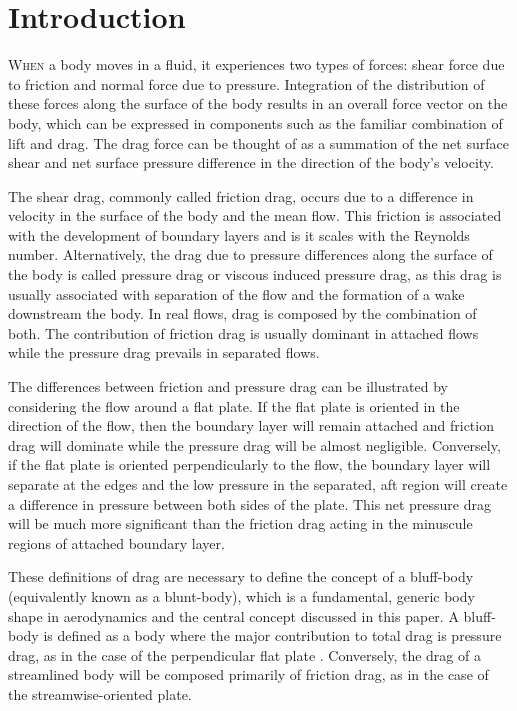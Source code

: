 \documentclass[journal]{new-aiaa}
\begin{document}
\section{Introduction} \label{sec:intro}


\lettrine{W}{hen} a body moves in a fluid, it experiences two types of forces: shear force due to friction and normal force due to pressure. Integration of the distribution of these forces along the surface of the body results in an overall force vector on the body, which can be expressed in components such as the familiar combination of lift and drag. The drag force can be thought of as a summation of the net surface shear and net surface pressure difference in the direction of the body's velocity.

The shear drag, commonly called friction drag, occurs due to a difference in velocity in the surface of the body and the mean flow. This friction is associated with the development of boundary layers and is it scales with the Reynolds number. Alternatively, the drag due to pressure differences along the surface of the body is called pressure drag or viscous induced pressure drag, as this drag is usually associated with separation of the flow and the formation of a wake downstream the body. In real flows, drag is composed by the combination of both. The contribution of friction drag is usually dominant in attached flows while the pressure drag prevails in separated flows.

The differences between friction and pressure drag can be illustrated by considering the flow around a flat plate. If the flat plate is oriented in the direction of the flow, then the boundary layer will remain attached and friction drag will dominate while the pressure drag will be almost negligible. Conversely, if the flat plate is oriented perpendicularly to the flow, the boundary layer will separate at the edges and the low pressure in the separated, aft region will create a difference in pressure between both sides of the plate.  This net pressure drag will be much more significant than the friction drag acting in the minuscule regions of attached boundary layer.

These definitions of drag are necessary to define the concept of a bluff-body (equivalently known as a blunt-body), which is a fundamental, generic body shape in aerodynamics and the central concept discussed in this paper. A bluff-body is defined as a body where the major contribution to total drag is pressure drag, as in the case of the perpendicular flat plate \cite{anderson2010fundamentals}.  Conversely, the drag of a streamlined body will be composed primarily of friction drag, as in the case of the streamwise-oriented plate.
\end{document}

